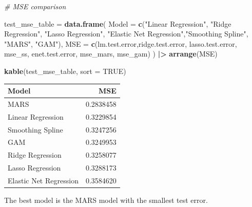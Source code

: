 \documentclass[
]{article}
\newenvironment{Shaded}{\begin{snugshade}}{\end{snugshade}}
\newcommand{\AttributeTok}[1]{\textcolor[rgb]{0.13,0.29,0.53}{#1}}
\newcommand{\CommentTok}[1]{\textcolor[rgb]{0.56,0.35,0.01}{\textit{#1}}}
\newcommand{\ConstantTok}[1]{\textcolor[rgb]{0.56,0.35,0.01}{#1}}
\newcommand{\FunctionTok}[1]{\textcolor[rgb]{0.13,0.29,0.53}{\textbf{#1}}}
\newcommand{\NormalTok}[1]{#1}
\newcommand{\OtherTok}[1]{\textcolor[rgb]{0.56,0.35,0.01}{#1}}
\newcommand{\SpecialCharTok}[1]{\textcolor[rgb]{0.81,0.36,0.00}{\textbf{#1}}}
\newcommand{\StringTok}[1]{\textcolor[rgb]{0.31,0.60,0.02}{#1}}
\begin{document}
\begin{Shaded}
\begin{Highlighting}[]
\CommentTok{\# MSE comparison}

\NormalTok{test\_mse\_table }\OtherTok{=} \FunctionTok{data.frame}\NormalTok{(}
  \AttributeTok{Model =} \FunctionTok{c}\NormalTok{(}\StringTok{"Linear Regression"}\NormalTok{, }\StringTok{"Ridge Regression"}\NormalTok{, }\StringTok{"Lasso Regression"}\NormalTok{, }
            \StringTok{"Elastic Net Regression"}\NormalTok{,}\StringTok{"Smoothing Spline"}\NormalTok{, }\StringTok{"MARS"}\NormalTok{, }\StringTok{"GAM"}\NormalTok{),}
  \AttributeTok{MSE =} \FunctionTok{c}\NormalTok{(lm.test.error,ridge.test.error,}
\NormalTok{          lasso.test.error, mse\_ss, enet.test.error, }
\NormalTok{          mse\_mars, mse\_gam)}
\NormalTok{) }\SpecialCharTok{|\textgreater{}} \FunctionTok{arrange}\NormalTok{(MSE)}

\FunctionTok{kable}\NormalTok{(test\_mse\_table, }\AttributeTok{sort =} \ConstantTok{TRUE}\NormalTok{)}
\end{Highlighting}
\end{Shaded}

\begin{longtable}[]{@{}lr@{}}
\toprule\noalign{}
Model & MSE \\
\midrule\noalign{}
\endhead
\bottomrule\noalign{}
\endlastfoot
MARS & 0.2838458 \\
Linear Regression & 0.3229854 \\
Smoothing Spline & 0.3247256 \\
GAM & 0.3249953 \\
Ridge Regression & 0.3258077 \\
Lasso Regression & 0.3288173 \\
Elastic Net Regression & 0.3584620 \\
\end{longtable}

The best model is the MARS model with the smallest test error.
\end{document}
